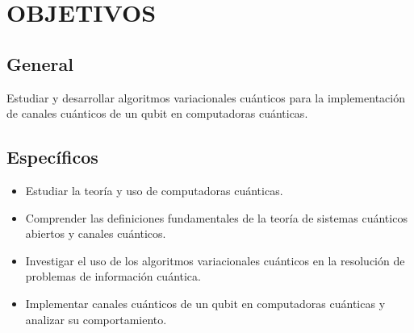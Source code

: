\documentclass[letterpaper,12pt]{thesisECFM}
\theoremstyle{plain}
\theoremstyle{definition}
\theoremstyle{definition}
\theoremstyle{remark}
\newcommand{\1}{\mathbb{1}}
\begin{document}
\chapter*{OBJETIVOS} %
{}
\section*{General} 
Estudiar y desarrollar algoritmos variacionales cuánticos para la implementación de canales cuánticos de un  qubit en computadoras cuánticas.

\section*{Específicos}
\begin{itemize}
    \item Estudiar la teoría y uso de computadoras cuánticas.
    \item Comprender las definiciones fundamentales de la teoría de sistemas cuánticos abiertos y canales cuánticos.
    \item Investigar el uso de los algoritmos variacionales cuánticos en la resolución de problemas de información cuántica.
    \item Implementar canales cuánticos de un qubit en computadoras cuánticas y analizar su comportamiento.
\end{itemize}
\end{document}
